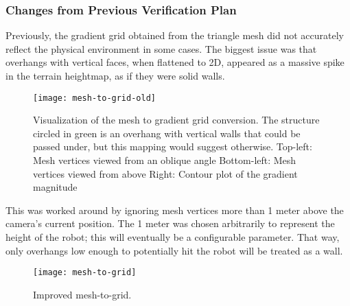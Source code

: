 \subsubsection{Changes from Previous Verification Plan}\label{subsubsec:changes-to-plan}
Previously, the gradient grid obtained from the triangle mesh did not accurately reflect the physical environment in
some cases.
The biggest issue was that overhangs with vertical faces, when flattened to 2D, appeared as a massive spike in the
terrain heightmap, as if they were solid walls.
\begin{figure}
    \centering
    \texttt{[image: mesh-to-grid-old]}
    \caption{
        Visualization of the mesh to gradient grid conversion. The structure circled in green is an overhang with vertical walls that could be passed under, but this mapping would suggest otherwise.\linebreak
        Top-left: Mesh vertices viewed from an oblique angle\linebreak
        Bottom-left: Mesh vertices viewed from above\linebreak
        Right: Contour plot of the gradient magnitude
    }
\end{figure}
This was worked around by ignoring mesh vertices more than 1 meter above the camera's current position.
The 1 meter was chosen arbitrarily to represent the height of the robot; this will eventually be a configurable
parameter.
That way, only overhangs low enough to potentially hit the robot will be treated as a wall.
\begin{figure}
    \centering
    \texttt{[image: mesh-to-grid]}
    \caption{Improved mesh-to-grid.}
\end{figure}